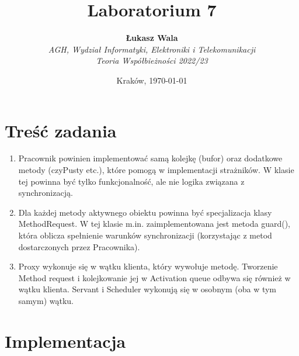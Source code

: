 \documentclass{article}
\title{Laboratorium 7}
\author{\textbf{Łukasz Wala}\\
    \textit{AGH, Wydział Informatyki, Elektroniki i Telekomunikacji} \\
    \textit{Teoria Współbieżności 2022/23}}
\date{Kraków, \today}
\begin{document}
\maketitle

\section{Treść zadania}
\begin{enumerate}
    \item 
    Pracownik powinien implementować samą kolejkę (bufor) oraz dodatkowe 
    metody (czyPusty etc.), które pomogą w implementacji strażników. W klasie tej 
    powinna być tylko funkcjonalność, ale nie logika związana z synchronizacją.
    \item
    Dla każdej metody aktywnego obiektu powinna być specjalizacja klasy MethodRequest. 
    W tej klasie m.in. zaimplementowana jest metoda guard(), która oblicza spełnienie 
    warunków synchronizacji (korzystając z metod dostarczonych przez Pracownika).
    \item
    Proxy wykonuje się w wątku klienta, który wywołuje metodę. Tworzenie Method request 
    i kolejkowanie jej w Activation queue odbywa się również w wątku klienta. Servant i 
    Scheduler wykonują się w osobnym (oba w tym samym) wątku.
\end{enumerate}

\section{Implementacja}
\end{document}
